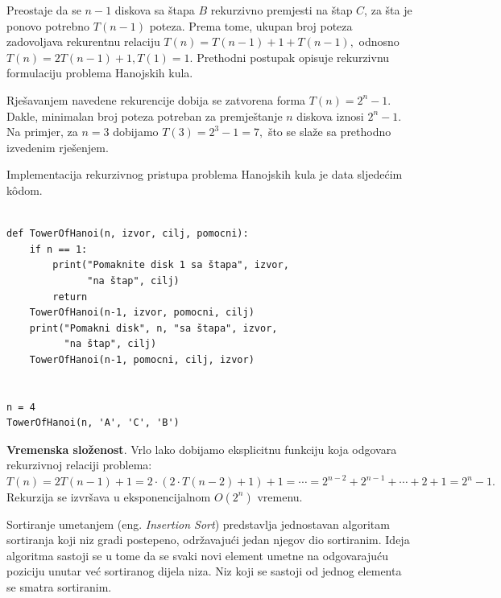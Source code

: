 \begin{solution}
	Preostaje da se $n-1$ diskova sa štapa $B$ rekurzivno premjesti na štap $C$, za šta je ponovo potrebno $T(n-1)$ poteza.  	Prema tome, ukupan broj poteza zadovoljava rekurentnu relaciju $ T(n)=T(n-1)+1+T(n-1),$  odnosno	$	T(n)=2T(n-1)+1, 	T(1)=1.$ Prethodni postupak opisuje rekurzivnu formulaciju problema Hanojskih kula.
	
	Rješavanjem navedene rekurencije dobija se zatvorena forma $T(n)=2^n-1.$	Dakle, minimalan broj poteza potreban za premještanje $n$ diskova iznosi 	$2^n-1.$ Na primjer, za $n=3$ dobijamo $T(3)=2^3-1=7,$ što se slaže sa prethodno izvedenim rješenjem.
\end{solution}

Implementacija rekurzivnog pristupa problema Hanojskih kula je data sljedećim k\^odom. 

\begin{verbatim}
	 
def TowerOfHanoi(n, izvor, cilj, pomocni):
    if n == 1:
        print("Pomaknite disk 1 sa štapa", izvor,
              "na štap", cilj)
        return
    TowerOfHanoi(n-1, izvor, pomocni, cilj)
    print("Pomakni disk", n, "sa štapa", izvor,
          "na štap", cilj)
    TowerOfHanoi(n-1, pomocni, cilj, izvor)


n = 4
TowerOfHanoi(n, 'A', 'C', 'B')
\end{verbatim} 

\textbf{Vremenska složenost}. Vrlo lako dobijamo eksplicitnu funkciju koja odgovara   rekurzivnoj relaciji problema: $T(n)= 2  T(n-1) + 1 = 2 \cdot ( 2 \cdot T(n-2) + 1) + 1 = \cdots = 2^{n-2} + 2^{n-1} + \cdots + 2 + 1 = 2^n -1.$
Rekurzija se izvršava u eksponencijalnom $O(2^n)$ vremenu.   
	
 

\begin{example}
  
     Sortiranje umetanjem (eng. \emph{Insertion Sort}) predstavlja jednostavan algoritam
     sortiranja koji niz gradi postepeno, održavajući   jedan njegov dio sortiranim. Ideja algoritma sastoji se u tome da se  svaki novi element umetne na odgovarajuću poziciju unutar već sortiranog dijela niza. Niz koji se sastoji od jednog elementa se smatra sortiranim. 
 \end{example}
 
